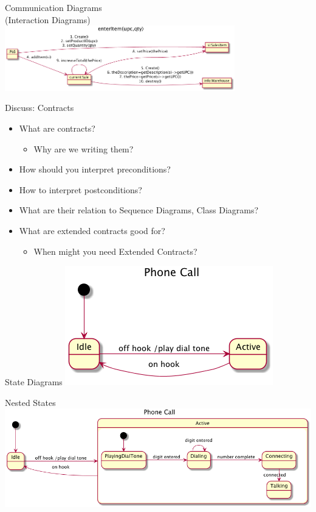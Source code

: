 \documentclass[10pt,t,a4paper]{beamer}
\begin{document}
\begin{frame}[label=sec-1-3]{Communication Diagrams \\ (Interaction Diagrams)}
\includegraphics[width=10cm]{FCommunicationDiagram.png}
\end{frame}

\begin{frame}[label=sec-1-4]{Discuss: Contracts}
\begin{itemize}
\item What are contracts?
\begin{itemize}
\item Why are we writing them?
\end{itemize}
\item How should you interpret preconditions?
\item How to interpret postconditions?
\item What are their relation to Sequence Diagrams, Class Diagrams?
\item What are extended contracts good for?
\begin{itemize}
\item When might you need Extended Contracts?
\end{itemize}
\end{itemize}
\end{frame}
\begin{frame}[label=sec-1-5]{State Diagrams}
\includegraphics[width=.9\linewidth]{FStateDiagramExample4.png}
\end{frame}

\begin{frame}[label=sec-1-6]{Nested States}
\includegraphics[width=.9\linewidth]{FStateDiagramExamplePhoneNested.png}
\end{frame}
\end{document}
